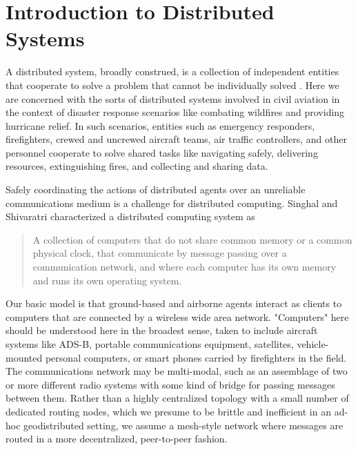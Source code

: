 \section{Introduction to Distributed Systems}

A distributed system, broadly construed, is a collection of
independent entities that cooperate to solve a problem that cannot be
individually solved \cite{kshemkalyani_singhal_2008}. Here we are
concerned with the sorts of distributed systems involved in civil
aviation in the context of disaster response scenarios like combating
wildfires and providing hurricane relief. In such scenarios, entities
such as emergency responders, firefighters, crewed and uncrewed
aircraft teams, air traffic controllers, and other personnel cooperate
to solve shared tasks like navigating safely, delivering resources,
extinguishing fires, and collecting and sharing data.

Safely coordinating the actions of distributed agents over an
unreliable communications medium is a challenge for distributed
computing. Singhal and Shivaratri \cite{10.5555/562065} characterized
a distributed computing system as

\begin{quotation}
  A collection of computers that do not share common memory or a
  common physical clock, that communicate by message passing over a
  communication network, and where each computer has its own memory
  and runs its own operating system.
\end{quotation}

Our basic model is that ground-based and airborne agents interact as
clients to computers that are connected by a wireless wide area
network. "Computers" here should be understood here in the broadest
sense, taken to include aircraft systems like ADS-B, portable
communications equipment, satellites, vehicle-mounted personal
computers, or smart phones carried by firefighters in the field. The
communications network may be multi-modal, such as an assemblage of
two or more different radio systems with some kind of bridge for
passing messages between them. Rather than a highly centralized
topology with a small number of dedicated routing nodes, which we
presume to be brittle and inefficient in an ad-hoc geodistributed
setting, we assume a mesh-style network where messages are routed in a
more decentralized, peer-to-peer fashion.

